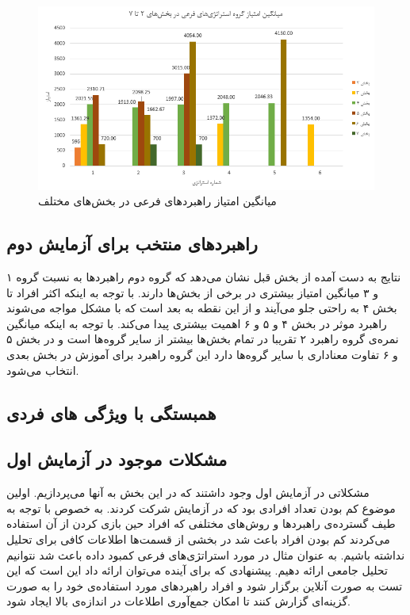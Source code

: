 \documentclass[twoside, a4paper,11pt]{book}
\numberwithin{equation}{chapter}
\numberwithin{table}{chapter}
\numberwithin{figure}{chapter}
\numberwithin{equation}{chapter}
\begin{document}
\begin{figure}
\centering
\includegraphics[scale=0.8]{Figures/notMainStrAvg.png}
\caption{\label{fig:notMainStrAvg}
میانگین امتیاز راهبردهای فرعی در بخش‌های مختلف
}
\end{figure}


\subsection{راهبردهای منتخب برای آزمایش دوم}

نتایج به دست آمده از بخش قبل نشان می‌دهد که گروه دوم راهبردها به نسبت گروه ۱ و ۳ میانگین امتیاز بیشتری در برخی از بخش‌ها دارند. با توجه به اینکه اکثر افراد تا بخش ۴ به راحتی جلو می‌آیند و از این نقطه به بعد است که با مشکل مواجه می‌شوند راهبرد موثر در بخش ۴ و ۵ و ۶ اهمیت بیشتری پیدا می‌کند. با توجه به اینکه میانگین نمره‌ی گروه راهبرد ۲ تقریبا در تمام بخش‌ها بیشتر از سایر گروه‌ها است و در بخش ۵ و ۶ تفاوت معناداری با سایر گروه‌ها دارد این گروه راهبرد برای آموزش در بخش بعدی انتخاب می‌شود.

\subsection{همبستگی با ویژگی های فردی}

\subsection{مشکلات موجود در آزمایش اول}

مشکلاتی در آزمایش اول وجود داشتند که در این بخش به آنها می‌پردازیم. اولین موضوع کم بودن تعداد افرادی بود که در آزمایش شرکت کردند. به خصوص با توجه به طیف گسترده‌ی راهبردها و روش‌های مختلفی که افراد حین بازی کردن از آن استفاده می‌کردند کم بودن افراد باعث شد در بخشی از قسمت‌ها اطلاعات کافی برای تحلیل نداشته باشیم. به عنوان مثال در مورد استراتژی‌های فرعی کمبود داده باعث شد نتوانیم تحلیل جامعی ارائه دهیم. پیشنهادی که برای آینده می‌توان ارائه داد این است که این تست به صورت آنلاین برگزار شود و افراد راهبردهای مورد استفاده‌ی خود را به صورت گزینه‌ای گزارش کنند تا امکان جمع‌آوری اطلاعات در اندازه‌ی بالا ایجاد شود.
\end{document}
